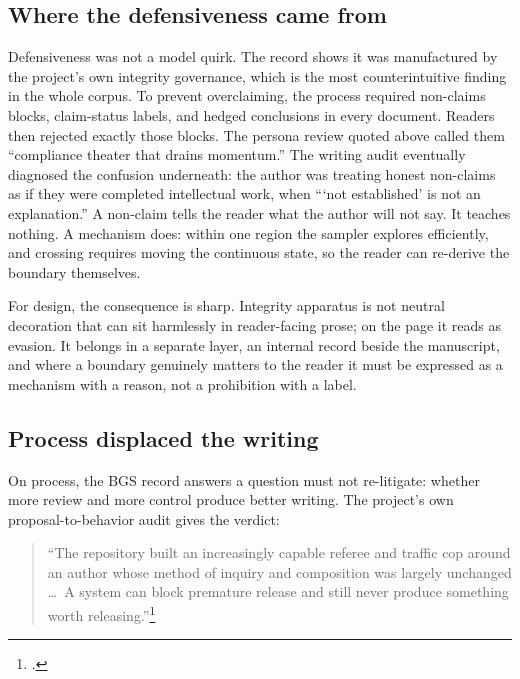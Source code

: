 \subsection{Where the defensiveness came from}
\label{sec:bgs-defensive}

Defensiveness was not a model quirk. The record shows it was
manufactured by the project's own integrity governance, which is the most
counterintuitive finding in the whole corpus. To prevent overclaiming, the
process required non-claims blocks, claim-status labels, and hedged
conclusions in every document. Readers then rejected exactly those blocks.
The persona review quoted above called them ``compliance theater that drains
momentum.'' The writing audit eventually diagnosed the confusion underneath:
the author was treating honest non-claims as if they were completed
intellectual work, when ```not established' is not an explanation.'' A
non-claim tells the reader what the author will not say. It teaches nothing.
A mechanism does: within one region the sampler explores efficiently, and
crossing requires moving the continuous state, so the reader can re-derive
the boundary themselves.

For design, the consequence is sharp. Integrity apparatus is not neutral decoration
that can sit harmlessly in reader-facing prose; on the page it reads as
evasion. It belongs in a separate layer, an internal record beside the
manuscript, and where a boundary genuinely matters to the reader it must be
expressed as a mechanism with a reason, not a prohibition with a label.

\subsection{Process displaced the writing}
\label{sec:bgs-process}

On process, the BGS record answers a question \hv{} must not re-litigate: whether more
review and more control produce better writing. The project's own
proposal-to-behavior audit gives the verdict:

\begin{quote}\small
``The repository built an increasingly capable referee and traffic cop around
an author whose method of inquiry and composition was largely unchanged
\ldots\ A system can block premature release and still never produce
something worth releasing.''\footnote{.}
\end{quote}

